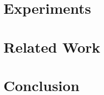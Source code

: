 \documentclass{sig-alternate-05-2015}
\begin{document}
\section{Experiments}

\section{Related Work}


\section{Conclusion}



















































\small{


}
\end{document}
